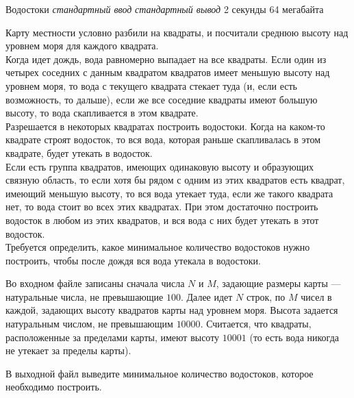 \begin{problem}%
{Водостоки}%
{\textsl{стандартный ввод}}%
{\textsl{стандартный вывод}}%
{2 секунды}%
{64 мегабайта}%
{}

Карту местности условно разбили на квадраты, и посчитали среднюю высоту над уровнем моря для каждого квадрата. \\

Когда идет дождь, вода равномерно выпадает на все квадраты. Если один из четырех соседних с данным квадратом квадратов имеет меньшую высоту над уровнем моря, то вода с текущего квадрата стекает туда (и, если есть возможность, то дальше), если же все соседние квадраты имеют большую высоту, то вода скапливается в этом квадрате. \\

Разрешается в некоторых квадратах построить водостоки. Когда на каком-то квадрате строят водосток, то вся вода, которая раньше скапливалась в этом квадрате, будет утекать в водосток. \\

Если есть группа квадратов, имеющих одинаковую высоту и образующих связную область, то если хотя бы рядом с одним из этих квадратов есть квадрат, имеющий меньшую высоту, то вся вода утекает туда, если же такого квадрата нет, то вода стоит во всех этих квадратах. При этом достаточно построить водосток в любом из этих квадратов, и вся вода с них будет утекать в этот водосток. \\

Требуется определить, какое минимальное количество водостоков нужно построить, чтобы после дождя вся вода утекала в водостоки.

\InputFile

Во входном файле записаны сначала числа $N$ и $M$, задающие размеры карты — натуральные числа, не превышающие $100$. Далее идет $N$ строк, по $M$ чисел в каждой, задающих высоту квадратов карты над уровнем моря. Высота задается натуральным числом, не превышающим $10000$. Считается, что квадраты, расположенные за пределами карты, имеют высоту $10001$ (то есть вода никогда не утекает за пределы карты).

\OutputFile

В выходной файл выведите минимальное количество водостоков, которое необходимо построить.

\Examples

\begin{example}
%
\end{example}

\end{problem}
